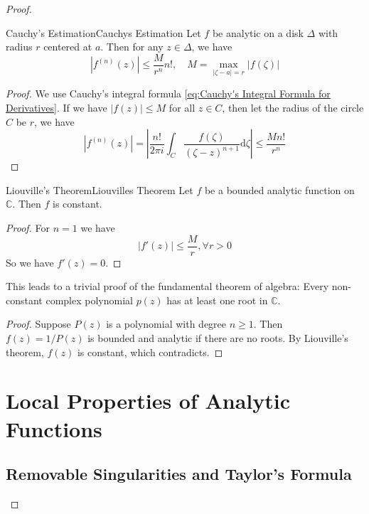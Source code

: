\documentclass[../main.tex]{subfiles}
\begin{document}
\begin{proof}
\begin{theorem}{Cauchy's Estimation}{Cauchys Estimation}
	Let $f$ be analytic on a disk $\Delta$ with radius $r$ centered at $a$. Then for any $z\in \Delta$, we have
	\begin{equation}
		\left|f^{(n)}(z)\right| \leq \frac{M}{r^n} n!, \quad M = \max_{\left|\zeta-a\right|=r} \left|f(\zeta)\right|
	\end{equation}
\end{theorem}
\begin{proof}
We use Cauchy's integral formula \ref{eq:Cauchy's Integral Formula for Derivatives}. If we have $\left|f(z)\right|\leq M$ for all $z\in C$, then let the radius of the circle $C$ be $r$, we have
	\begin{equation}
		\left|f^{(n)}(z)\right| = \left|\frac{n!}{2 \pi i} \int_C \frac{f(\zeta)}{(\zeta - z)^{n+1}} \mathrm{d} \zeta\right| \leq \frac{M n!}{r^n}
	\end{equation}
\end{proof}

\begin{theorem}{Liouville's Theorem}{Liouvilles Theorem}
	Let $f$ be a bounded analytic function on $\mathbb{C}$. Then $f$ is constant.
\end{theorem}
\begin{proof}
	For $n=1$ we have 
	\begin{equation*}
		\left|f'(z)\right| \leq \frac{M}{r}, \forall r>0
	\end{equation*}
	So we have $f'(z)=0$.
\end{proof}
This leads to a trivial proof of the fundamental theorem of algebra: Every non-constant complex polynomial $p(z)$ has at least one root in $\mathbb{C}$.
\begin{proof}
	Suppose $P(z)$ is a polynomial with degree $n\geq 1$. Then $f(z) = 1 / P(z)$ is bounded and analytic if there are no roots. By Liouville's theorem, $f(z)$ is constant, which contradicts.
\end{proof}

\section{Local Properties of Analytic Functions}

\subsection{Removable Singularities and Taylor's Formula}


\end{proof}
\end{document}
